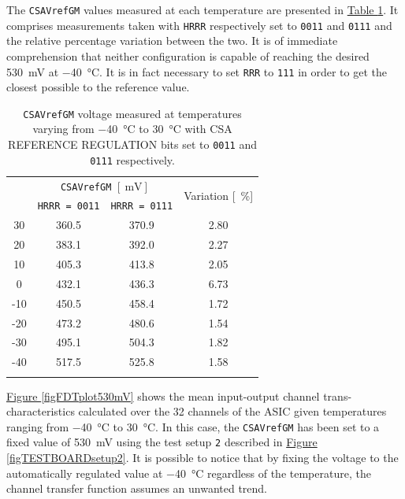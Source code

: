 \noindent
The \texttt{CSAVrefGM} values measured at each temperature are presented in \hyperref[tablecsavref]{Table \ref{tablecsavref}}. It comprises measurements taken with \texttt{HRRR} respectively set to \texttt{0011} and \texttt{0111} and the relative percentage variation between the two. It is of immediate comprehension that neither configuration is capable of reaching the desired \SI{530}{\milli\volt} at \SI{-40}{\celsius}. It is in fact necessary to set \texttt{RRR} to \texttt{111} in order to get the closest possible to the reference value.

\begin{table}[ht]
    \centering
    \begin{tabular}{c c c c} 
        \Xhline{2\arrayrulewidth}
        \multirow{2}{*}{Temperature [\SI{}{\celsius}]} \T & \multicolumn{2}{p{5cm}}{\centering \texttt{CSAVrefGM} $[\SI{}{\milli\volt}]$} \T & \multirow{2}{*}{Variation [\SI{}{\percent}]} \\
        \cline{2-3}
        & \texttt{HRRR = 0011} & \texttt{HRRR = 0111} \B\\
        \hline
        30 & 360.5 & 370.9 & 2.80 \T\B \\
        20 & 383.1 & 392.0 & 2.27 \T\B \\
        10 & 405.3 & 413.8 & 2.05 \T\B \\
        0 & 432.1 & 436.3 & 6.73 \T\B \\
        -10 & 450.5 & 458.4 & 1.72 \T\B \\
        -20 & 473.2 & 480.6 & 1.54 \T\B \\
        -30 & 495.1 & 504.3 & 1.82 \T\B \\
        -40 & 517.5 & 525.8 & 1.58 \T\B \\
        \Xhline{2\arrayrulewidth}
    \end{tabular}
    \caption{\texttt{CSAVrefGM} voltage measured at temperatures varying from \SI{-40}{\celsius} to \SI{30}{\celsius} with CSA REFERENCE REGULATION bits set to \texttt{0011} and \texttt{0111} respectively.}
    \label{tablecsavref}
\end{table}

\hyperref[figFDTplot530mV]{Figure \ref{figFDTplot530mV}} shows the mean input-output channel trans-characteristics calculated over the 32 channels of the ASIC given temperatures ranging from \SI{-40}{\celsius} to \SI{30}{\celsius}. In this case, the \texttt{CSAVrefGM} has been set to a fixed value of \SI{530}{\milli\volt} using the test setup \texttt{2} described in \hyperref[figTESTBOARDsetup2]{Figure \ref{figTESTBOARDsetup2}}. It is possible to notice that by fixing the voltage to the automatically regulated value at \SI{-40}{\celsius} regardless of the temperature, the channel transfer function assumes an unwanted trend.  

